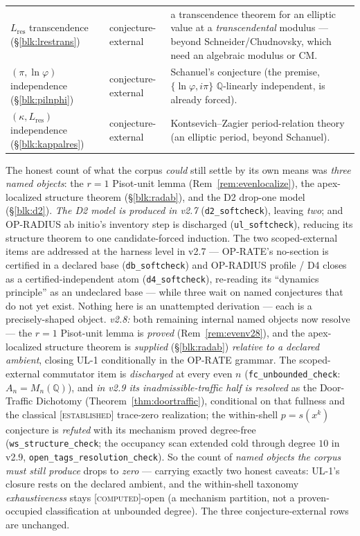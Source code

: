 \documentclass[11pt]{article}
\newcommand{\tagC}{\textcolor{cC}{\textsc{[computed]}}}
\newcommand{\tagE}{\textcolor{cE}{\textsc{[established]}}}
\newcommand{\Q}{\mathbb{Q}}
\newcommand{\gp}{\varphi}
\theoremstyle{plain}
\theoremstyle{definition}
\theoremstyle{remark}
\begin{document}
\begin{center}
\begin{tabular}{@{}p{3.5cm}p{1.9cm}p{8.3cm}@{}}
$L_{\mathrm{res}}$ transcendence (\S\ref{blk:lrestrans}) & conjecture-external & a transcendence theorem for an elliptic value at a \emph{transcendental} modulus --- beyond Schneider/Chudnovsky, which need an algebraic modulus or CM.\\[2pt]
$(\pi,\ln\gp)$ independence (\S\ref{blk:pilnphi}) & conjecture-external & Schanuel's conjecture (the premise, $\{\ln\gp,i\pi\}$ $\Q$-linearly independent, is already forced).\\[2pt]
$(\kappa,L_{\mathrm{res}})$ independence (\S\ref{blk:kappalres}) & conjecture-external & Kontsevich--Zagier period-relation theory (an elliptic period, beyond Schanuel).\\
\bottomrule
\end{tabular}
\end{center}
\noindent The honest count of what the corpus \emph{could} still settle by its own
means was \emph{three named objects}: the $r=1$ Pisot-unit lemma
(Rem~\ref{rem:evenlocalize}), the apex-localized structure theorem
(\S\ref{blk:radab}), and the D2 drop-one model (\S\ref{blk:d2}). \emph{The D2 model
is produced in v2.7} (\texttt{d2\_softcheck}), leaving \emph{two}; and OP-RADIUS ab
initio's inventory step is discharged (\texttt{ul\_softcheck}), reducing its
structure theorem to one candidate-forced induction. The two scoped-external items
are addressed at the harness level in v2.7 --- OP-RATE's no-section is certified in a
declared base (\texttt{db\_softcheck}) and OP-RADIUS profile / D4 closes as a
certified-independent atom (\texttt{d4\_softcheck}), re-reading its ``dynamics
principle'' as an undeclared base --- while three wait on named conjectures that do
not yet exist. Nothing here is an unattempted derivation --- each is a
precisely-shaped object. \emph{v2.8:} both remaining internal named objects now
resolve --- the $r=1$ Pisot-unit lemma is \emph{proved} (Rem~\ref{rem:evenv28}), and
the apex-localized structure theorem is \emph{supplied} (\S\ref{blk:radab})
\emph{relative to a declared ambient}, closing UL-1 conditionally in the OP-RATE
grammar. The scoped-external commutator item is \emph{discharged} at every even $n$
(\texttt{fc\_unbounded\_check}: $A_n=M_n(\Q)$), and \emph{in v2.9 its
inadmissible-traffic half is resolved} as the Door-Traffic Dichotomy
(Theorem~\ref{thm:doortraffic}), conditional on that fullness and the classical
\tagE{} trace-zero realization; the within-shell $p=s(x^k)$ conjecture is
\emph{refuted} with its mechanism proved degree-free (\texttt{ws\_structure\_check};
the occupancy scan extended cold through degree $10$ in v2.9,
\texttt{open\_tags\_resolution\_check}). So the count of \emph{named objects the
corpus must still produce} drops to \emph{zero} --- carrying exactly two honest
caveats: UL-1's closure rests on the declared ambient, and the within-shell taxonomy
\emph{exhaustiveness} stays \tagC{}-open (a mechanism partition, not a
proven-occupied classification at unbounded degree). The three conjecture-external
rows are unchanged.
\end{document}
